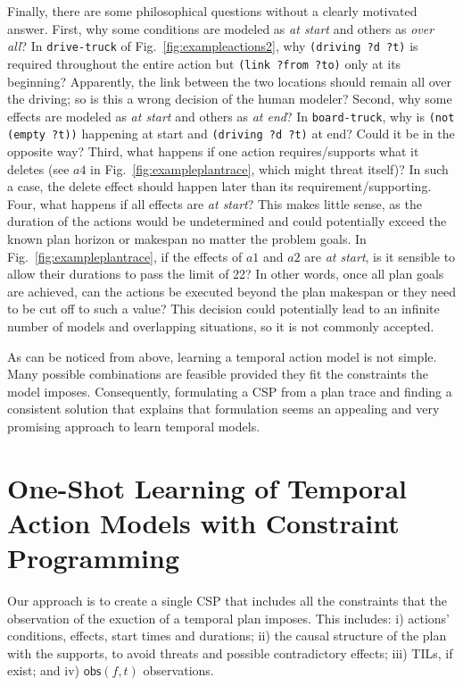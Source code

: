 \documentclass[runningheads]{llncs}
\newcommand{\obs}{\mathsf{obs}}    %
\begin{document}
Finally, there are some philosophical questions without a clearly motivated answer. First, why some conditions are modeled as \emph{at start} and others as \emph{over all}? In \texttt{drive-truck} of Fig.~\ref{fig:exampleactions2}, why \texttt{(driving ?d ?t)} is required throughout the entire action but \texttt{(link ?from ?to)} only at its beginning? Apparently, the link between the two locations should remain all over the driving; so is this a wrong decision of the human modeler?
Second, why some effects are modeled as \emph{at start} and others as \emph{at end}? In \texttt{board-truck}, why is \texttt{(not (empty ?t))} happening at start and \texttt{(driving ?d ?t)} at end? Could it be in the opposite way?
Third, what happens if one action requires/supports what it deletes (see $a4$ in Fig.~\ref{fig:exampleplantrace}, which might threat itself)? In such a case, the delete effect should happen later than its requirement/supporting.
Four, what happens if all effects are \emph{at start}? This makes little sense, as the duration of the actions would be undetermined and could potentially exceed the known plan horizon or makespan no matter the problem goals. In Fig.~\ref{fig:exampleplantrace}, if the effects of $a1$ and $a2$ are \emph{at start}, is it sensible to allow their durations to pass the limit of 22? In other words, once all plan goals are achieved, can the actions be executed beyond the plan makespan or they need to be cut off to such a value? This decision could potentially lead to an infinite number of models and overlapping situations, so it is not commonly accepted.

As can be noticed from above, learning a temporal action model is not simple. Many possible combinations are feasible provided they fit the constraints the model imposes. Consequently, formulating a CSP from a plan trace and finding a consistent solution that explains that formulation seems an appealing and very promising approach to learn temporal models.



\section{One-Shot Learning of Temporal Action Models with Constraint Programming}
\label{sec:CPformulation}

Our approach is to create a single CSP that includes all the constraints that the observation of the exuction of a temporal plan imposes. This includes: i) actions' conditions, effects, start times and durations; ii) the causal structure of the plan with the supports, to avoid threats and possible contradictory effects; iii) TILs, if exist; and iv) $\obs(f,t)$ observations. 
\end{document}
